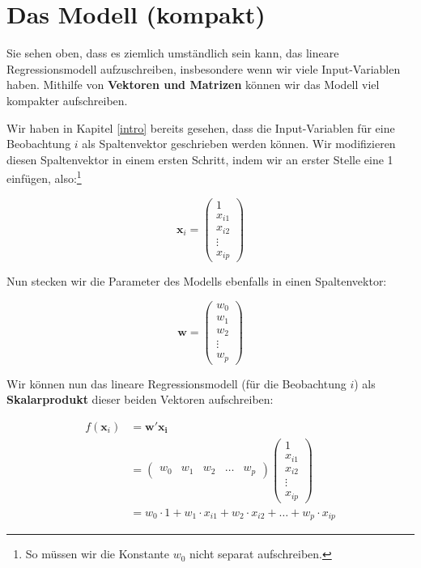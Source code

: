 \documentclass[
]{book}
\begin{document}
\hypertarget{das-modell-kompakt}{%
\section{Das Modell (kompakt)}\label{das-modell-kompakt}}

Sie sehen oben, dass es ziemlich umständlich sein kann, das lineare Regressionsmodell aufzuschreiben, insbesondere wenn wir viele Input-Variablen haben. Mithilfe von \textbf{Vektoren und Matrizen} können wir das Modell viel kompakter aufschreiben.

Wir haben in Kapitel \ref{intro} bereits gesehen, dass die Input-Variablen für eine Beobachtung \(i\) als Spaltenvektor geschrieben werden können. Wir modifizieren diesen Spaltenvektor in einem ersten Schritt, indem wir an erster Stelle eine 1 einfügen, also:\footnote{So müssen wir die Konstante \(w_0\) nicht separat aufschreiben.}

\[\mathbf{x}_i=\begin{pmatrix} 1\\ x_{i1} \\ x_{i2} \\ \vdots \\ x_{ip} \end{pmatrix}\]

Nun stecken wir die Parameter des Modells ebenfalls in einen Spaltenvektor:

\[\mathbf{w}=\begin{pmatrix} w_0 \\ w_1 \\ w_2 \\ \vdots \\ w_p \end{pmatrix}\]

Wir können nun das lineare Regressionsmodell (für die Beobachtung \(i\)) als \textbf{Skalarprodukt} dieser beiden Vektoren aufschreiben:

\begin{align}
f(\mathbf{x}_i) &= \mathbf{w}' \mathbf{x_i}\\ 
&= \begin{pmatrix} w_0 & w_1 & w_2 & \dots & w_p \end{pmatrix} \begin{pmatrix} 1\\ x_{i1} \\ x_{i2} \\ \vdots \\ x_{ip} \end{pmatrix}\\
&= w_0 \cdot 1 + w_1 \cdot x_{i1} + w_2 \cdot x_{i2} + \dots + w_p \cdot x_{ip}
\end{align}
\end{document}
